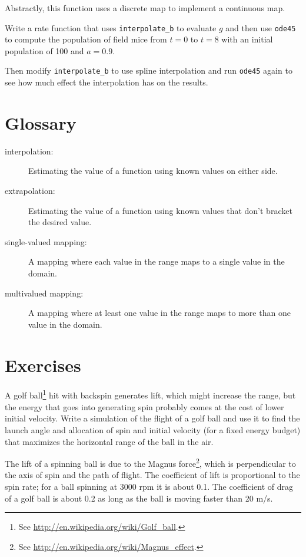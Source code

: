 Abstractly, this function uses a discrete map to implement a
continuous map. 

\begin{ex}
Write a rate function that uses
{\tt interpolate\_b} to evaluate $g$ and then
use {\tt ode45} to compute the population of field mice
from $t=0$ to $t=8$ with an initial population of 100 and
$a=0.9$.

Then modify {\tt interpolate\_b} to use spline interpolation
and run {\tt ode45} again to see how much effect the interpolation
has on the results.
\end{ex}

\section{Glossary}

\begin{description}

\item[interpolation:] Estimating the value of a function using
known values on either side.

\item[extrapolation:] Estimating the value of a function using
known values that don't bracket the desired value.

\item[single-valued mapping:] A mapping where each value in the
range maps to a single value in the domain.

\item[multivalued mapping:] A mapping where at least one value in
the range maps to more than one value in the domain.

\end{description}


\section{Exercises}

\begin{ex}
\label{golf}

A golf ball\footnote{See
\url{http://en.wikipedia.org/wiki/Golf_ball}.} hit with backspin
generates lift, which might increase the range, but the energy that
goes into generating spin probably comes at the cost of lower initial
velocity. Write a simulation of the flight of a golf ball and use it
to find the launch angle and allocation of spin and initial velocity
(for a fixed energy budget) that maximizes the horizontal range of the
ball in the air.

The lift of a spinning ball is due to the Magnus force\footnote{See
\url{http://en.wikipedia.org/wiki/Magnus_effect}.}, which is
perpendicular to the axis of spin and the path of flight. The
coefficient of lift is proportional to the spin rate; for a ball
spinning at 3000 rpm it is about 0.1. The coefficient of drag of a
golf ball is about 0.2 as long as the ball is moving faster than 20 m/s.
\end{ex}

